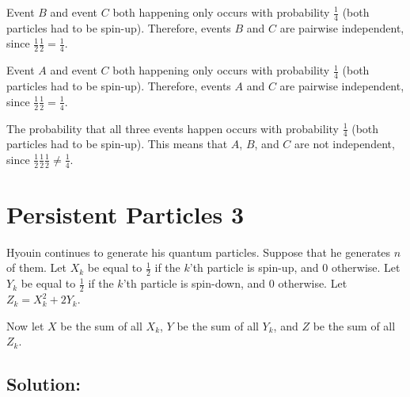 \documentclass{article}
\begin{document}
Event $B$ and event $C$ both happening only occurs with probability $\frac{1}{4}$ (both particles had to be spin-up). Therefore, events $B$ and $C$ are pairwise independent, since $\frac{1}{2} \frac{1}{2} = \frac{1}{4}$.

Event $A$ and event $C$ both happening only occurs with probability $\frac{1}{4}$ (both particles had to be spin-up). Therefore, events $A$ and $C$ are pairwise independent, since $\frac{1}{2} \frac{1}{2} = \frac{1}{4}$.

The probability that all three events happen occurs with probability $\frac{1}{4}$ (both particles had to be spin-up). This means that $A$, $B$, and $C$ are not independent, since $\frac{1}{2} \frac{1}{2} \frac{1}{2} \neq \frac{1}{4}$.

\vspace{4cm}

\section{Persistent Particles 3}

Hyouin continues to generate his quantum particles. Suppose that he generates $n$ of them. Let $X_k$ be equal to $\frac{1}{2}$ if the $k$'th particle is spin-up, and $0$ otherwise. Let $Y_k$ be equal to $\frac{1}{2}$ if the $k$'th particle is spin-down, and $0$ otherwise. Let $Z_k = X_k^2 + 2Y_k$.

Now let $X$ be the sum of all $X_k$, $Y$ be the sum of all $Y_k$, and $Z$ be the sum of all $Z_k$.

\subsection{Solution:}
\end{document}
